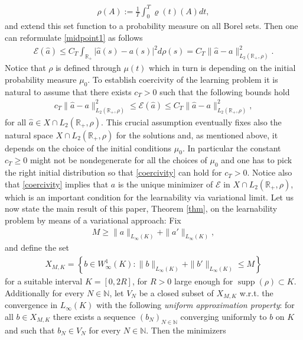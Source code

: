 \documentclass[A4paper,11pt]{article}
\theoremstyle{definition}
\newcommand{\N}{\mathbb{N}}
\newcommand{\R}{\mathbb{R}}
\DeclareMathOperator{\supp}{supp}
\begin{document}
\begin{align}\label{eq-rho-4}
	\rho(A):=\frac{1}{T}\int_0^T\varrho(t)(A)dt,
\end{align}
and extend this set function to a probability measure on all Borel sets.
Then one can reformulate \eqref{midpoint1} as follows
\begin{align}\label{midpoint2}
	\mathcal E(\widehat a)\leq C_T \int_{\R_+}\bigl|\widehat a(s)-a(s)\bigr|^2 d \rho(s)
		= C_T \| \widehat a - a \|^2_{L_2(\mathbb R_+,\rho)}.
\end{align}
Notice that $\rho$ is defined through $\mu(t)$ which in turn is depending on the initial probability measure $\mu_0$. To establish coercivity of the learning problem
it is natural to assume that there exists  $c_T>0$ such that the following bounds hold
\begin{align}\label{coercivity}
	c_T \| \widehat a - a \|^2_{L_2(\mathbb R_+,\rho)} \leq \mathcal E(\widehat a)\leq C_T  \| \widehat a - a \|^2_{L_2(\mathbb R_+,\rho)},
\end{align}
for all $\widehat a \in X \cap  L_2(\mathbb R_+,\rho)$. This crucial assumption eventually fixes also the natural space $X \cap  L_2(\mathbb R_+,\rho)$ for the solutions 
and, as mentioned above, it depends on the choice of the initial conditions $\mu_0$. In particular the constant $c_T\geq 0$ might not be nondegenerate for all the choices of $\mu_0$
and one has to pick the right initial distribution so that \eqref{coercivity} can hold for $c_T >0$. Notice also that \eqref{coercivity} implies that $a$ is the unique minimizer of $\mathcal E$ in $X \cap  L_2(\mathbb R_+,\rho)$,
which is an important condition for the learnability via variational limit. 
Let us now state the main result of this paper, Theorem \ref{thm},  on the learnability problem by means of a variational approach: Fix 
\begin{align*}
	M \geq \|a\|_{L_{\infty}(K)} + \|a'\|_{L_{\infty}(K)},
	\end{align*}
and define the set
\begin{align*}
X_{M,K} = \left\{b \in W^{1}_{\infty}(K) :
 \|b\|_{L_{\infty}(K)} + \|b'\|_{L_{\infty}(K)} \leq M
 \right\}
\end{align*}
for a suitable interval $K=[0,2 R]$, for $R>0$ large enough for $\supp(\rho) \subset K$.
Additionally for every $N \in \N$, let $V_N$ be a closed subset of $X_{M,K}$ w.r.t. the convergence in $L_{\infty}(K)$ with the following {\it uniform approximation property}: for all $b\in X_{M,K}$ there exists a sequence $(b_N)_{N \in \N}$ converging uniformly to $b$ on $K$ and such that $b_N\in V_N$ for every $N \in \N$. Then the minimizers 
\end{document}
